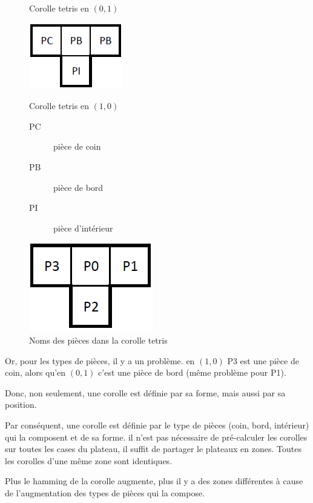 \begin{exmp}
\begin{figure}[H]
\begin{minipage}{0.33\textwidth}
\begin{center}
					\caption{Corolle tetris en $(0,1)$}\label{fig:corolle_tetris_1}
					\includegraphics{images/corolle_tetris_2.png}
					\caption{Corolle tetris en $(1,0)$}\label{fig:corolle_tetris_2}
				\end{center}
			\end{minipage}\hfill
			\begin{minipage}{0.33\textwidth}
				\begin{description}
					\item[PC] pièce de coin
					\item[PB] pièce de bord
					\item[PI] pièce d'intérieur
				\end{description}
				
				\includegraphics{images/corolle_tetris.png}
				\caption{Noms des pièces dans la corolle tetris}\label{fig:corolle_tetris}
			\end{minipage}\hfill
		\end{figure}
		
		Or, pour les types de pièces, il y a un problème. en $(1,0)$ P3 est une pièce de coin, alors qu'en $(0,1)$ c'est une pièce de bord (même problème pour P1).
		
		Donc, non seulement, une corolle est définie par sa forme, mais aussi par sa position.
	\end{exmp}
	
	Par conséquent, une corolle est définie par le type de pièces (coin, bord, intérieur) qui la composent et de sa forme. il n'est pas nécessaire de pré-calculer les corolles sur toutes les cases du plateau, il suffit de partager le plateaux en zones. Toutes les corolles d'une même zone sont identiques.
	
	\begin{rem}
		Plus le hamming de la corolle augmente, plus il y a des zones différentes à cause de l'augmentation des types de pièces qui la compose.
	\end{rem}
	

